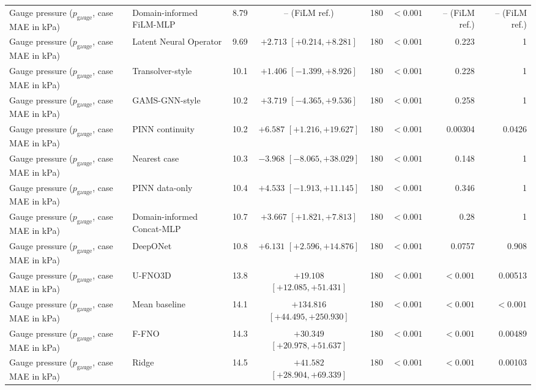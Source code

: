 \begin{landscape}
\begin{longtable}{p{4.0cm}p{3.4cm}rcrrrr}
Gauge pressure ($p_{\mathrm{gauge}}$, case MAE in kPa) & Domain-informed FiLM-MLP & 8.79 & -- (FiLM ref.) & 180 & $< 0.001$ & -- (FiLM ref.) & -- (FiLM ref.) \\
Gauge pressure ($p_{\mathrm{gauge}}$, case MAE in kPa) & Latent Neural Operator & 9.69 & $+2.713$ $[+0.214, +8.281]$ & 180 & $< 0.001$ & 0.223 & 1 \\
Gauge pressure ($p_{\mathrm{gauge}}$, case MAE in kPa) & Transolver-style & 10.1 & $+1.406$ $[-1.399, +8.926]$ & 180 & $< 0.001$ & 0.228 & 1 \\
Gauge pressure ($p_{\mathrm{gauge}}$, case MAE in kPa) & GAMS-GNN-style & 10.2 & $+3.719$ $[-4.365, +9.536]$ & 180 & $< 0.001$ & 0.258 & 1 \\
Gauge pressure ($p_{\mathrm{gauge}}$, case MAE in kPa) & PINN continuity & 10.2 & $+6.587$ $[+1.216, +19.627]$ & 180 & $< 0.001$ & 0.00304 & 0.0426 \\
Gauge pressure ($p_{\mathrm{gauge}}$, case MAE in kPa) & Nearest case & 10.3 & $-3.968$ $[-8.065, +38.029]$ & 180 & $< 0.001$ & 0.148 & 1 \\
Gauge pressure ($p_{\mathrm{gauge}}$, case MAE in kPa) & PINN data-only & 10.4 & $+4.533$ $[-1.913, +11.145]$ & 180 & $< 0.001$ & 0.346 & 1 \\
Gauge pressure ($p_{\mathrm{gauge}}$, case MAE in kPa) & Domain-informed Concat-MLP & 10.7 & $+3.667$ $[+1.821, +7.813]$ & 180 & $< 0.001$ & 0.28 & 1 \\
Gauge pressure ($p_{\mathrm{gauge}}$, case MAE in kPa) & DeepONet & 10.8 & $+6.131$ $[+2.596, +14.876]$ & 180 & $< 0.001$ & 0.0757 & 0.908 \\
Gauge pressure ($p_{\mathrm{gauge}}$, case MAE in kPa) & U-FNO3D & 13.8 & $+19.108$ $[+12.085, +51.431]$ & 180 & $< 0.001$ & $< 0.001$ & 0.00513 \\
Gauge pressure ($p_{\mathrm{gauge}}$, case MAE in kPa) & Mean baseline & 14.1 & $+134.816$ $[+44.495, +250.930]$ & 180 & $< 0.001$ & $< 0.001$ & $< 0.001$ \\
Gauge pressure ($p_{\mathrm{gauge}}$, case MAE in kPa) & F-FNO & 14.3 & $+30.349$ $[+20.978, +51.637]$ & 180 & $< 0.001$ & $< 0.001$ & 0.00489 \\
Gauge pressure ($p_{\mathrm{gauge}}$, case MAE in kPa) & Ridge & 14.5 & $+41.582$ $[+28.904, +69.339]$ & 180 & $< 0.001$ & $< 0.001$ & 0.00103 \\
\bottomrule\end{longtable}\end{landscape}
